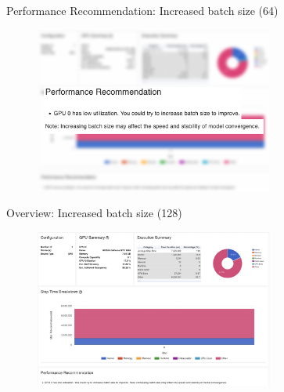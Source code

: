 \documentclass[compress,aspectratio=169]{beamer}
\begin{document}
\begin{frame}{Performance Recommendation: Increased batch size (64)}
    \vspace{-1em}
\begin{center}
    \begin{figure}
        \includegraphics[width=0.7\textwidth]{./assets/scap_gtx1080_profiler-torch_batch-size-64_14650758_zoom}
    \end{figure}
    \end{center}

\end{frame}


\begin{frame}{Overview: Increased batch size (128)}
    \vspace{-1em}
\begin{center}
    \begin{figure}
        \includegraphics[width=0.7\textwidth]{./assets/scap_gtx1080_profiler-torch_batch-size-128_14650759}
    \end{figure}
    \end{center}

\end{frame}
\end{document}
